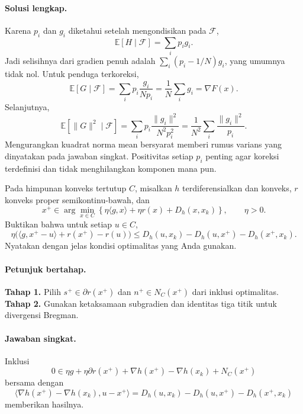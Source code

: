 \paragraph{Solusi lengkap.}
\label{orig03:ps04:solution:0001}
Karena $p_i$ dan $g_i$ diketahui setelah mengondisikan pada $\mathcal F$,
\[
 \mathbb E[H\mid\mathcal F]=\sum_i p_i g_i.
\]
Jadi selisihnya dari gradien penuh adalah
$\sum_i(p_i-1/N)g_i$, yang umumnya tidak nol. Untuk penduga terkoreksi,
\[
 \mathbb E[G\mid\mathcal F]
 =\sum_i p_i\frac{g_i}{Np_i}
 =\frac1N\sum_i g_i=\nabla F(x).
\]
Selanjutnya,
\[
 \mathbb E[\lVert G\rVert^2\mid\mathcal F]
 =\sum_i p_i\frac{\lVert g_i\rVert^2}{N^2p_i^2}
 =\frac1{N^2}\sum_i\frac{\lVert g_i\rVert^2}{p_i}.
\]
Mengurangkan kuadrat norma mean bersyarat memberi rumus varians yang
dinyatakan pada jawaban singkat. Positivitas setiap $p_i$ penting agar koreksi
terdefinisi dan tidak menghilangkan komponen mana pun.

\begin{exercise}
\label{orig03:ps04:exercise:0002}
Pada himpunan konveks tertutup $C$, misalkan $h$ terdiferensialkan dan konveks,
$r$ konveks proper semikontinu-bawah, dan
\[
 x^+\in\arg\min_{x\in C}
 \left\{\eta\langle g,x\rangle+\eta r(x)+D_h(x,x_k)\right\},
 \qquad \eta>0.
\]
Buktikan bahwa untuk setiap $u\in C$,
\[
 \eta\bigl(\langle g,x^+-u\rangle+r(x^+)-r(u)\bigr)
 \le D_h(u,x_k)-D_h(u,x^+)-D_h(x^+,x_k).
\]
Nyatakan dengan jelas kondisi optimalitas yang Anda gunakan.
\end{exercise}

\paragraph{Petunjuk bertahap.}
\label{orig03:ps04:hint:0002}
\textbf{Tahap 1.} Pilih $s^+\in\partial r(x^+)$ dan
$n^+\in N_C(x^+)$ dari inklusi optimalitas.
\textbf{Tahap 2.} Gunakan ketaksamaan subgradien dan identitas tiga titik
untuk divergensi Bregman.

\paragraph{Jawaban singkat.}
\label{orig03:ps04:answer:0002}
Inklusi
\[
 0\in\eta g+\eta\partial r(x^+)+\nabla h(x^+)-\nabla h(x_k)+N_C(x^+)
\]
bersama dengan
\[
 \langle\nabla h(x^+)-\nabla h(x_k),u-x^+\rangle
 =D_h(u,x_k)-D_h(u,x^+)-D_h(x^+,x_k)
\]
memberikan hasilnya.

